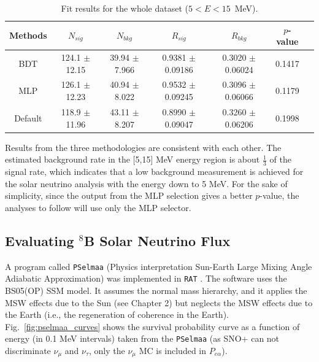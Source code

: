 \begin{table}[ht]
	\small{
	\centering
	\caption{Fit results for the whole dataset ($5<E<15$~MeV).	\label{table:wholedata_output}}
	\begin{tabular*}{150mm}{c@{\extracolsep{\fill}}cccccc}
		\toprule
		Methods & $N_{sig}$ & $N_{bkg}$ & $R_{sig}$ & $R_{bkg}$ & $p$-value\\
		\hline
		BDT & 124.1 $\pm$ 12.15 & 39.94 $\pm$ 7.966 & 0.9381 $\pm$ 0.09186 & 0.3020 $\pm$ 0.06024 & 0.1417\\
		MLP & 126.1 $\pm$ 12.23 & 40.94 $\pm$ 8.022 & 0.9532 $\pm$ 0.09245  & 0.3096 $\pm$ 0.06066  & 0.1179\\
		Default & 118.9 $\pm$ 11.96 & 43.11 $\pm$ 8.207 & 0.8990 $\pm$ 0.09047 & 0.3260 $\pm$ 0.06206 & 0.1998\\
		\bottomrule
	\end{tabular*}
}
\end{table}

Results from the three methodologies are consistent with each other. The estimated background rate in the [5,15] MeV energy region is about $\frac{1}{3}$ of the signal rate, which indicates that a low background measurement is achieved for the solar neutrino analysis with the energy down to 5 MeV. For the sake of simplicity, since the output from the MLP selection gives a better $p$-value, the analyses to follow will use only the MLP selector. 

\subsection{Evaluating $^8$B Solar Neutrino Flux}\label{sect:evaluateFlux}

A program called \texttt{PSelmaa} (Physics interpretation Sun-Earth Large Mixing Angle Adiabatic
Approximation) was implemented in \texttt{RAT} \cite{fady_pselmaa}. The software uses the BS05(OP) SSM model. It assumes the normal mass hierarchy, and it applies the MSW effects due to the Sun (see Chapter 2) but neglects the MSW effects due to the Earth (i.e., the regeneration of coherence in the Earth). Fig.~\ref{fig:pselmaa_curves} shows the survival probability curve as a function of energy (in 0.1 MeV intervals) taken from the \texttt{PSelmaa} (as SNO+ can not discriminate $\nu_\mu$ and $\nu_\tau$, only the $\nu_\mu$ MC is included in $P_{e\alpha}$).


